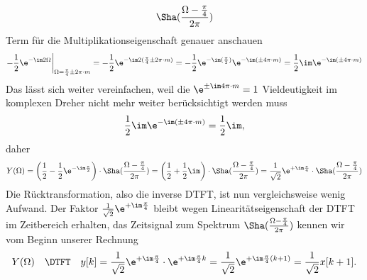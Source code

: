 \begin{ExCalc}
\begin{align}
\Sha(\frac{\Omega-\frac{\pi}{4}}{2\pi})
\end{align}
Term für die Multiplikationseigenschaft genauer anschauen
\begin{align}
-\frac{1}{2}\e^{-\im 2 \Omega}\bigg|_{\Omega=\frac{\pi}{4}\pm 2\pi \cdot m} =
-\frac{1}{2}\e^{-\im 2 (\frac{\pi}{4}\pm 2\pi \cdot m)} =
-\frac{1}{2}\e^{-\im (\frac{\pi}{2})}\e^{-\im (\pm 4\pi \cdot m)}=
\frac{1}{2}\im\e^{-\im (\pm 4\pi \cdot m)}
\end{align}
%
Das lässt sich weiter vereinfachen, weil die $\e^{\pm \im 4 \pi \cdot m}=1$ Vieldeutigkeit
im komplexen Dreher nicht mehr weiter berücksichtigt werden muss
\begin{align}
\frac{1}{2}\im\e^{-\im (\pm 4\pi \cdot m)} = \frac{1}{2}\im,
\end{align}
daher
\begin{align}
Y(\Omega) = \left(\frac{1}{2} - \frac{1}{2} \e^{-\im \frac{\pi}{2}}\right)
\cdot
\Sha(\frac{\Omega-\frac{\pi}{4}}{2\pi}) =
\left(\frac{1}{2} + \frac{1}{2} \im \right)
\cdot
\Sha(\frac{\Omega-\frac{\pi}{4}}{2\pi}) =
\frac{1}{\sqrt{2}} \e^{+\im\frac{\pi}{4}}\cdot\Sha(\frac{\Omega-\frac{\pi}{4}}{2\pi})
\end{align}
Die Rücktransformation, also die inverse DTFT, ist nun vergleichsweise wenig Aufwand.
%
Der Faktor $\frac{1}{\sqrt{2}} \e^{+\im\frac{\pi}{4}}$ bleibt wegen Linearitätseigenschaft
der DTFT im Zeitbereich erhalten, das Zeitsignal zum Spektrum $\Sha(\frac{\Omega-\frac{\pi}{4}}{2\pi})$
kennen wir vom Beginn unserer Rechnung
\begin{align}
Y(\Omega) \quad\DTFT\quad y[k] = \frac{1}{\sqrt{2}} \e^{+\im\frac{\pi}{4}} \cdot \e^{+\im \frac{\pi}{4} k}=
\frac{1}{\sqrt{2}} \e^{+\im \frac{\pi}{4} (k+1)} = \frac{1}{\sqrt{2}} x[k+1].
\end{align}


\end{ExCalc}
